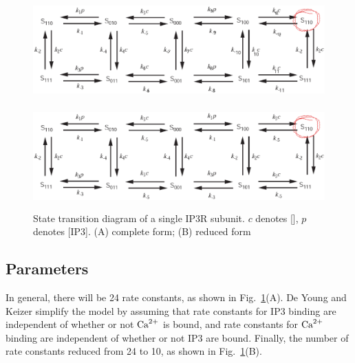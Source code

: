 \begin{figure}[hbt]
 \centerline{\includegraphics[height=4cm]{./images/IP3R_subunit_state.eps}}
 \centerline{\includegraphics[height=4cm]{./images/DeYoung-Keizer_subunit.eps}}
 
 \caption{State transition diagram of a single IP3R subunit.  $c$
   denotes [], $p$ denotes [IP3]. (A) complete form; (B) reduced form
   }
\label{fig:DYK_subunit_general}
\end{figure}

\subsection{Parameters}

In general, there will be 24 rate constants, as shown in
Fig.~\ref{fig:DYK_subunit_general}(A). De Young and Keizer simplify the model by
assuming that rate constants for IP3 binding are independent of whether or not
${\text{Ca}^{2+}}$ is bound, and rate constants for ${\text{Ca}^{2+}}$ binding are independent of whether
or not IP3 are bound. Finally, the number of rate constants reduced from 24 to
10, as shown in Fig.~\ref{fig:DYK_subunit_general}(B).

